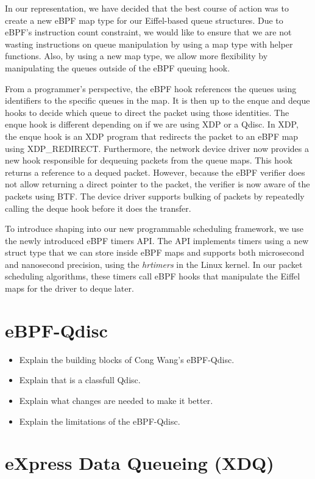 \documentclass[sigconf, nonacm]{acmart}
\begin{document}
In our representation, we have decided that the best course of action was to
create a new eBPF map type for our Eiffel-based queue structures. Due to eBPF's
instruction count constraint, we would like to ensure that we are not wasting
instructions on queue manipulation by using a map type with helper functions.
Also, by using a new map type, we allow more flexibility by manipulating the
queues outside of the eBPF queuing hook.

From a programmer's perspective, the eBPF hook references the queues using
identifiers to the specific queues in the map. It is then up to the enque and
deque hooks to decide which queue to direct the packet using those identities.
The enque hook is different depending on if we are using XDP or a Qdisc. In
XDP, the enque hook is an XDP program that redirects the packet to an eBPF map
using XDP\_REDIRECT. Furthermore, the network device driver now provides a new
hook responsible for dequeuing packets from the queue maps. This hook returns a
reference to a dequed packet. However, because the eBPF verifier does not
allow returning a direct pointer to the packet, the verifier is now aware of the
packets using BTF. The device driver supports bulking of packets by repeatedly
calling the deque hook before it does the transfer.

To introduce shaping into our new programmable scheduling framework, we use the
newly introduced eBPF timers API. The API implements timers using a new struct
type that we can store inside eBPF maps and supports both microsecond and
nanosecond precision, using the \textit{hrtimers} in the Linux kernel. In our
packet scheduling algorithms, these timers call eBPF hooks that manipulate the
Eiffel maps for the driver to deque later.


\section{eBPF-Qdisc}

\begin{itemize}
  \item Explain the building blocks of Cong Wang's eBPF-Qdisc.
  \item Explain that is a classfull Qdisc.
  \item Explain what changes are needed to make it better.
  \item Explain the limitations of the eBPF-Qdisc.
\end{itemize}


\section{eXpress Data Queueing (XDQ)}
\end{document}
